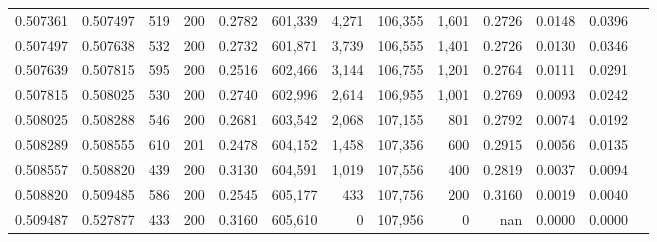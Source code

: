 \begin{tabular}{rrrrrrrrrrrrr}
0.507361 & 0.507497 &   519 & 200 &                                     0.2782 & 601,339 &   4,271 & 106,355 &   1,601 & 0.2726 & 0.0148 & 0.0396 \\
0.507497 & 0.507638 &   532 & 200 &                                     0.2732 & 601,871 &   3,739 & 106,555 &   1,401 & 0.2726 & 0.0130 & 0.0346 \\
0.507639 & 0.507815 &   595 & 200 &                                     0.2516 & 602,466 &   3,144 & 106,755 &   1,201 & 0.2764 & 0.0111 & 0.0291 \\
0.507815 & 0.508025 &   530 & 200 &                                     0.2740 & 602,996 &   2,614 & 106,955 &   1,001 & 0.2769 & 0.0093 & 0.0242 \\
0.508025 & 0.508288 &   546 & 200 &                                     0.2681 & 603,542 &   2,068 & 107,155 &     801 & 0.2792 & 0.0074 & 0.0192 \\
0.508289 & 0.508555 &   610 & 201 &                                     0.2478 & 604,152 &   1,458 & 107,356 &     600 & 0.2915 & 0.0056 & 0.0135 \\
0.508557 & 0.508820 &   439 & 200 &                                     0.3130 & 604,591 &   1,019 & 107,556 &     400 & 0.2819 & 0.0037 & 0.0094 \\
0.508820 & 0.509485 &   586 & 200 &                                     0.2545 & 605,177 &     433 & 107,756 &     200 & 0.3160 & 0.0019 & 0.0040 \\
0.509487 & 0.527877 &   433 & 200 &                                     0.3160 & 605,610 &       0 & 107,956 &       0 &    nan & 0.0000 & 0.0000 \\
\bottomrule
\end{tabular}
